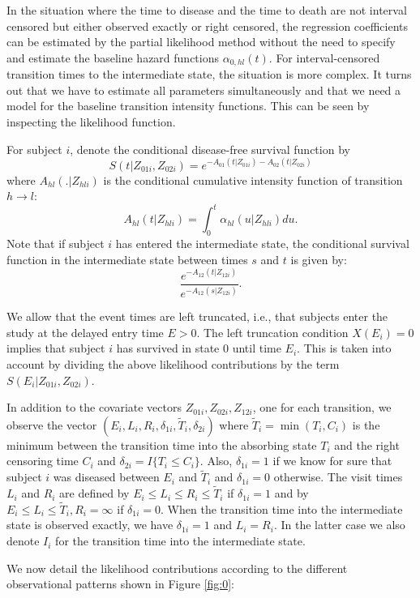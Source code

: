 \documentclass{article}
\begin{document}
In the situation where the time to disease and the time to death are
not interval censored but either observed exactly or right censored,
the regression coefficients can be estimated by the partial likelihood
method without the need to specify and estimate the baseline hazard
functions $\alpha_{0,hl}(t)$. For interval-censored transition times
to the intermediate state, the situation is more complex. It turns out
that we have to estimate all parameters simultaneously and that we
need a model for the baseline transition intensity functions. This can
be seen by inspecting the likelihood function.

For subject $i$, denote the conditional disease-free survival function
by $$S(t|Z_{01i},Z_{02i})=e^{- A_{01}(t|Z_{01i}) -A_{02}(t|Z_{02i})}$$
where ${A}_{hl}(.|Z_{hli})$ is the conditional cumulative intensity
function of transition $h \rightarrow l$: $${A}_{hl}(t|Z_{hli})=\int_0^t
{\alpha}_{hl}(u|Z_{hli})du.$$ Note that if subject $i$ has entered the
intermediate state, the conditional survival function in the
intermediate state between times $s$ and $t$ is given by: $$ \frac{
e^{-{A}_{12}(t|Z_{12i})}}{e^{-{A}_{12}(s|Z_{12i})}}.$$

We allow that the event times are left truncated, i.e., that subjects
enter the study at the delayed entry time $E>0$. The left truncation
condition $X(E_{i})=0$ implies that subject $i$ has survived in state
0 until time $E_{i}$. This is taken into account by dividing the above
likelihood contributions by the term ${S(E_{i}|Z_{01i},Z_{02i})}$.

In addition to the covariate vectors $Z_{01i},Z_{02i},Z_{12i}$, one
for each transition, we observe the vector
$(E_i,L_i,R_i,\delta_{1i},\tilde T_i,\delta_{2i})$ where $\tilde
T_i=\min(T_i,C_i)$ is the minimum between the transition time into the
absorbing state $T_i$ and the right censoring time $C_i$ and
$\delta_{2i}=I\{T_i\le C_i\}$. Also, $\delta_{1i}=1$ if we know for
sure that subject $i$ was diseased between $E_i$ and $\tilde T_i$ and
$\delta_{1i}=0$ otherwise. The visit times $L_i$ and $R_i$ are defined
by $E_i\le L_i\le R_i\le \tilde T_i$ if $\delta_{1i}=1$ and by $E_i\le
L_i \le \tilde T_i, R_i=\infty$ if $\delta_{1i}=0$. When the
transition time into the intermediate state is observed exactly, we
have $\delta_{1i}=1$ and $L_i=R_i$. In the latter case we also denote
$I_i$ for the transition time into the intermediate state.

We now detail the likelihood contributions according to the different
observational patterns shown in Figure \ref{fig:0}:
\end{document}
